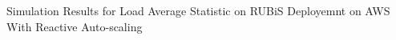 \label{stratos} Simulation Results for Load Average Statistic on RUBiS Deployemnt on AWS With Reactive Auto-scaling